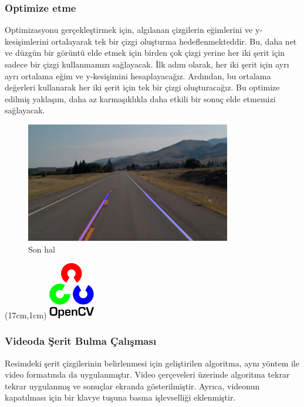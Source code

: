 \documentclass{article}
\begin{document}
\subsubsection{Optimize etme}
Optimizasyonu gerçekleştirmek için, algılanan çizgilerin eğimlerini ve y-kesişimlerini ortalayarak tek bir çizgi oluşturma hedeflenmekteddir. Bu, daha net ve düzgün bir görüntü elde etmek için birden çok çizgi yerine her iki şerit için sadece bir çizgi kullanmamızı sağlayacak. İlk adım olarak, her iki şerit için ayrı ayrı ortalama eğim ve y-kesişimini hesaplayacağız. Ardından, bu ortalama değerleri kullanarak her iki şerit için tek bir çizgi oluşturacağız. Bu optimize edilmiş yaklaşım, daha az karmaşıklıkla daha etkili bir sonuç elde etmemizi sağlayacak.\\[5pt]

\begin{figure}[h]
  \centering
  \includegraphics[width=0.8\textwidth]{image/Resim31.png} %
  \caption{Son hal}
  \label{fig:python29}  
\end{figure}
\newpage
\begin{textblock*}{5cm}(17cm,1cm) %
    \includegraphics[width=2cm]{image/Resim17.png} %
\end{textblock*}
\subsubsection{Videoda Şerit Bulma Çalışması}
Resimdeki şerit çizgilerinin belirlenmesi için geliştirilen algoritma, aynı yöntem ile video formatında da uygulanmıştır. Video çerçeveleri üzerinde algoritma tekrar tekrar uygulanmış ve sonuçlar ekranda gösterilmiştir. Ayrıca, videonun kapatılması için bir klavye tuşuna basma işlevselliği eklenmiştir.
\end{document}
